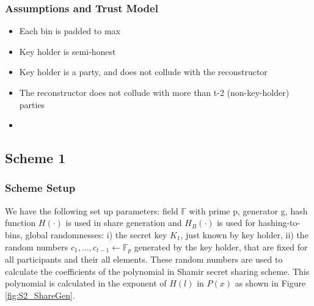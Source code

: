 \subsubsection{Assumptions and Trust Model}
\begin{itemize}
    \item Each bin is padded to max
    \item Key holder is semi-honest
    \item Key holder is a party, and does not collude with the reconstructor
    \item The reconstructor does not collude with more than t-2 (non-key-holder)
    parties
    \item
\end{itemize}

\subsection{Scheme 1}
\subsubsection{Scheme Setup}
We have the following set up parameters: field $\mathbb{F}$ with prime p, generator g, hash function $H(\cdot)$ is used in share generation and $H_B(\cdot)$ is used for hashing-to-bins, global randomnesses: i) the secret key $K_1$, just known by key holder, ii) the random numbers $c_1, \dots, c_{t-1} \gets \mathbb{F}_p$ generated by the key holder, that are fixed for all participants and their all elements. These random numbers are used to calculate the coefficients of the polynomial in Shamir secret sharing scheme. This polynomial is calculated in the exponent of $H(l)$ in $P(x)$ as shown in Figure \ref{fig:S2_ShareGen}.

